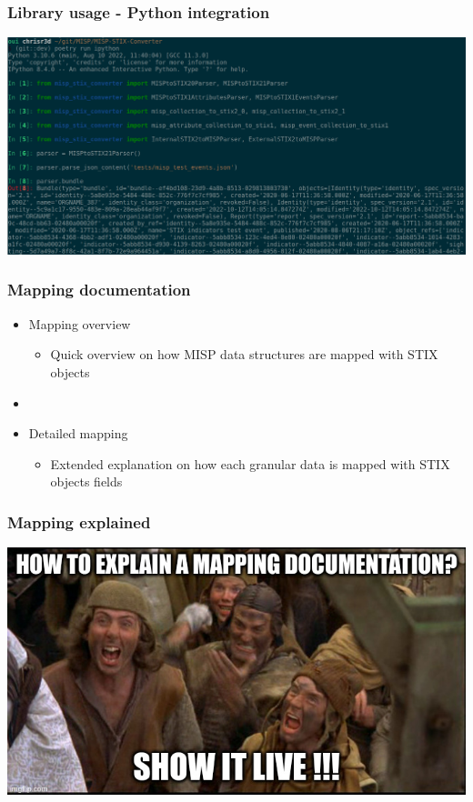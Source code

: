 \begin{frame}
    \frametitle{Library usage - Python integration}
    \centering
    \includegraphics[scale=0.12]{images/python_usage.png}
\end{frame}

\begin{frame}
    \frametitle{Mapping documentation}
    \begin{itemize}
        \item Mapping overview
        \begin{itemize}
            \item Quick overview on how MISP data structures are mapped with STIX objects
        \end{itemize}
        \item []
        \item Detailed mapping
        \begin{itemize}
            \item Extended explanation on how each granular data is mapped with STIX objects fields
        \end{itemize}
    \end{itemize}
\end{frame}

\begin{frame}
    \frametitle{Mapping explained}
    \centering
    \includegraphics[scale=0.45]{images/demo1.jpg}
\end{frame}

